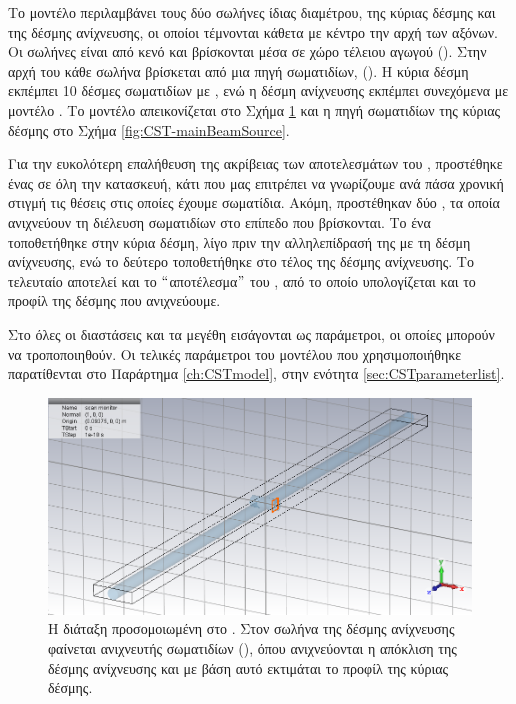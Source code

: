Το μοντέλο περιλαμβάνει τους δύο σωλήνες ίδιας διαμέτρου, της κύριας δέσμης και της δέσμης ανίχνευσης, οι οποίοι τέμνονται κάθετα με κέντρο την αρχή των αξόνων. Οι σωλήνες είναι από κενό και βρίσκονται μέσα σε χώρο τέλειου αγωγού ().
Στην αρχή του κάθε σωλήνα βρίσκεται από μια πηγή σωματιδίων, (). 
Η κύρια δέσμη εκπέμπει 10 δέσμες σωματιδίων με , ενώ η δέσμη ανίχνευσης εκπέμπει συνεχόμενα με μοντέλο . 
Το μοντέλο απεικονίζεται στο Σχήμα \ref{fig:CST-PICmonitor} και η πηγή σωματιδίων της κύριας δέσμης στο Σχήμα \ref{fig:CST-mainBeamSource}.

Για την ευκολότερη επαλήθευση της ακρίβειας των αποτελεσμάτων του , προστέθηκε ένας  σε όλη την κατασκευή, κάτι που μας επιτρέπει να γνωρίζουμε ανά πάσα χρονική στιγμή τις θέσεις στις οποίες έχουμε σωματίδια.
Ακόμη, προστέθηκαν δύο , τα οποία ανιχνεύουν τη διέλευση σωματιδίων στο επίπεδο που βρίσκονται.
Το ένα τοποθετήθηκε στην κύρια δέσμη, λίγο πριν την αλληλεπίδρασή της με τη δέσμη ανίχνευσης, ενώ το δεύτερο τοποθετήθηκε στο τέλος της δέσμης ανίχνευσης.
Το τελευταίο αποτελεί και το $``$αποτέλεσμα$"$ του , από το οποίο υπολογίζεται και το προφίλ της δέσμης που ανιχνεύουμε.

Στο  όλες οι διαστάσεις και τα μεγέθη εισάγονται ως παράμετροι, οι οποίες μπορούν να τροποποιηθούν. Οι τελικές παράμετροι του μοντέλου που χρησιμοποιήθηκε παρατίθενται στο Παράρτημα \ref{ch:CSTmodel}, στην ενότητα \ref{sec:CSTparameterlist}.

\begin{figure}[tbh]
\includegraphics[width=\textwidth]{figures/CST-pic-monitor}
\centering
\caption[Η διάταξη προσομοιωμένη στο ]
{Η διάταξη προσομοιωμένη στο . 
Στον σωλήνα της δέσμης ανίχνευσης φαίνεται ανιχνευτής σωματιδίων (), όπου ανιχνεύονται η απόκλιση της δέσμης ανίχνευσης και με βάση αυτό εκτιμάται το προφίλ της κύριας δέσμης.}
\label{fig:CST-PICmonitor}
\end{figure}

